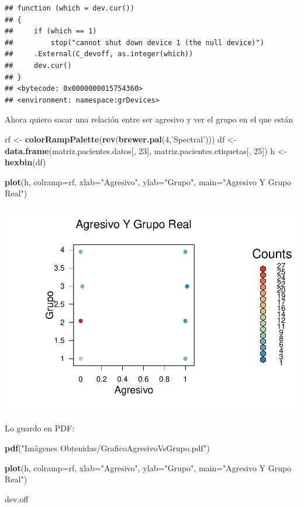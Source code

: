 \documentclass[]{article}
\newenvironment{Shaded}{\begin{snugshade}}{\end{snugshade}}
\newcommand{\KeywordTok}[1]{\textcolor[rgb]{0.13,0.29,0.53}{\textbf{#1}}}
\newcommand{\DataTypeTok}[1]{\textcolor[rgb]{0.13,0.29,0.53}{#1}}
\newcommand{\DecValTok}[1]{\textcolor[rgb]{0.00,0.00,0.81}{#1}}
\newcommand{\StringTok}[1]{\textcolor[rgb]{0.31,0.60,0.02}{#1}}
\newcommand{\NormalTok}[1]{#1}
\begin{document}
\begin{verbatim}
## function (which = dev.cur()) 
## {
##     if (which == 1) 
##         stop("cannot shut down device 1 (the null device)")
##     .External(C_devoff, as.integer(which))
##     dev.cur()
## }
## <bytecode: 0x0000000015754360>
## <environment: namespace:grDevices>
\end{verbatim}

Ahora quiero sacar una relación entre ser agresivo y ver el grupo en el
que están

\begin{Shaded}
\begin{Highlighting}[]
\NormalTok{rf <-}\StringTok{ }\KeywordTok{colorRampPalette}\NormalTok{(}\KeywordTok{rev}\NormalTok{(}\KeywordTok{brewer.pal}\NormalTok{(}\DecValTok{4}\NormalTok{,}\StringTok{'Spectral'}\NormalTok{)))}
\NormalTok{df <-}\StringTok{ }\KeywordTok{data.frame}\NormalTok{(matriz.pacientes.datos[, }\DecValTok{23}\NormalTok{], matriz.pacientes.etiquetas[, }\DecValTok{25}\NormalTok{])}
\NormalTok{h <-}\StringTok{ }\KeywordTok{hexbin}\NormalTok{(df)}

\KeywordTok{plot}\NormalTok{(h, }\DataTypeTok{colramp=}\NormalTok{rf, }\DataTypeTok{xlab=}\StringTok{"Agresivo"}\NormalTok{, }\DataTypeTok{ylab=}\StringTok{"Grupo"}\NormalTok{, }\DataTypeTok{main=}\StringTok{"Agresivo Y Grupo Real"}\NormalTok{)}
\end{Highlighting}
\end{Shaded}

\includegraphics{codigo_files/figure-latex/grafico_agresivo_grupo-1.pdf}

Lo guardo en PDF:

\begin{Shaded}
\begin{Highlighting}[]
\KeywordTok{pdf}\NormalTok{(}\StringTok{"Imágenes Obtenidas/GraficoAgresivoVsGrupo.pdf"}\NormalTok{)}

\KeywordTok{plot}\NormalTok{(h, }\DataTypeTok{colramp=}\NormalTok{rf, }\DataTypeTok{xlab=}\StringTok{"Agresivo"}\NormalTok{, }\DataTypeTok{ylab=}\StringTok{"Grupo"}\NormalTok{, }\DataTypeTok{main=}\StringTok{"Agresivo Y Grupo Real"}\NormalTok{)}

\NormalTok{dev.off}
\end{Highlighting}
\end{Shaded}
\end{document}
